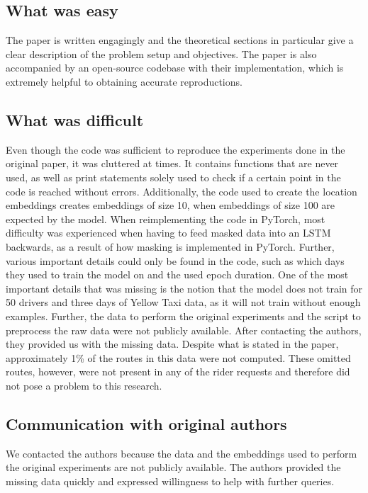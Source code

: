 \subsection{What was easy}

The paper is written engagingly and the theoretical sections in particular give a clear description of the problem setup and objectives. The paper is also accompanied by an open-source codebase with their implementation, which is extremely helpful to obtaining accurate reproductions.

\subsection{What was difficult}

Even though the code was sufficient to reproduce the experiments done in the original paper, it was cluttered at times. It contains functions that are never used, as well as print statements solely used to check if a certain point in the code is reached without errors. Additionally, the code used to create the location embeddings creates embeddings of size 10, when embeddings of size 100 are expected by the model. When reimplementing the code in PyTorch, most difficulty was experienced when having to feed masked data into an LSTM backwards, as a result of how masking is implemented in PyTorch. Further, various important details could only be found in the code, such as which days they used to train the model on and the used epoch duration. One of the most important details that was missing is the notion that the model does not train for 50 drivers and three days of Yellow Taxi data, as it will not train without enough examples. Further, the data to perform the original experiments and the script to preprocess the raw data were not publicly available. After contacting the authors, they provided us with the missing data. Despite what is stated in the paper, approximately 1\% of the routes in this data were not computed. These omitted routes, however, were not present in any of the rider requests and therefore did not pose a problem to this research.

\subsection{Communication with original authors}

We contacted the authors because the data and the embeddings used to perform the original experiments are not publicly available. The authors provided the missing data quickly and expressed willingness to help with further queries.
